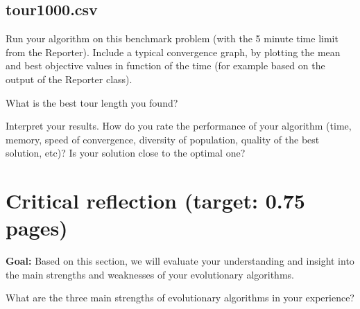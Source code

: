 \documentclass[a4paper,10pt]{article}
\newcommand{\ReplaceMe}[1]{{\color{blue}#1}}
\newcommand{\RemoveMe}[1]{{\color{purple}#1}}
\begin{document}
\subsection{tour1000.csv}

\ReplaceMe{Run your algorithm on this benchmark problem (with the 5 minute time limit from the Reporter). Include a typical convergence graph, by plotting the mean and best objective values in function of the time (for example based on the output of the Reporter class). 

What is the best tour length you found? 

Interpret your results. How do you rate the performance of your algorithm (time, memory, speed of convergence, diversity of population, quality of the best solution, etc)? Is your solution close to the optimal one? }


\section{Critical reflection (target: 0.75 pages)}

\RemoveMe{\textbf{Goal:} Based on this section, we will evaluate your understanding and insight into the main strengths and weaknesses of your evolutionary algorithms.}

\ReplaceMe{What are the three main strengths of evolutionary algorithms in your experience?}
\end{document}
